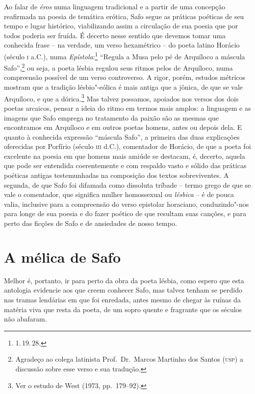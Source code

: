 Ao falar de \textit{éros} numa linguagem tradicional e a partir de uma concepção
reafirmada na poesia de temática erótica, Safo segue as práticas poéticas de
seu tempo e lugar histórico, viabilizando assim a circulação de sua poesia
que por todos poderia ser fruída. É decerto nesse sentido que
devemos tomar uma conhecida frase -- na verdade, um verso hexamétrico -- do poeta
latino Horácio (século \textsc{i} a.C.), numa \textit{Epístola}:\footnote{1.\,19.\,28.}
``Regula a Musa pelo pé de Arquíloco a máscula Safo”,\footnote{ Agradeço
ao colega latinista Prof.~Dr.~Marcos Martinho dos Santos (\textsc{usp}) a discussão sobre esse verso e
sua tradução.} ou seja, a poeta lésbia regulou seus ritmos pelos de Arquíloco,
numa compreensão possível de um verso controverso. A rigor, porém,
estudos métricos mostram que a tradição lésbio"-eólica é mais antiga que a
jônica, de que se vale Arquíloco, e que a dórica.\footnote{ Ver o estudo de West
(1973, pp.~179--92).} Mas talvez possamos, apoiados nos versos dos dois poetas
arcaicos, pensar a ideia do ritmo em termos mais amplos: a linguagem e
as imagens que Safo emprega no tratamento da paixão são as mesmas que
encontramos em Arquíloco e em outros poetas homens, antes ou depois dela. E
quanto à conhecida expressão ``máscula Safo”, a primeira das duas
explicações oferecidas por Porfírio (século \textsc{iii} d.C.), comentador de Horácio,
de que a poeta foi excelente na poesia em que homens mais amiúde se
destacam, é, decerto, aquela que pode ser entendida coerentemente e com
respaldo vasto e sólido das práticas poéticas antigas testemunhadas na
composição dos textos sobreviventes. A segunda, de que Safo foi difamada como
dissoluta tríbade -- termo grego de que se vale o comentador, que significa
mulher homossexual ou \textit{lésbica} -- é de pouca valia, inclusive para a
compreensão do verso epistolar horaciano, conduzindo"-nos para longe de sua
poesia e do fazer poético de que resultam suas canções, e para perto das
ficções de Safo e de ansiedades de nosso tempo. 


\section*{A mélica de Safo}

Melhor é, portanto, ir para perto da obra da poeta lésbia, como espero que esta
antologia evidencie aos que creem conhecer Safo, mas talvez tenham se perdido
nas tramas lendárias em que foi enredada, antes mesmo de chegar às ruínas da
matéria viva que resta da poeta, de um sopro quente e fragrante que os séculos
não abafaram.

